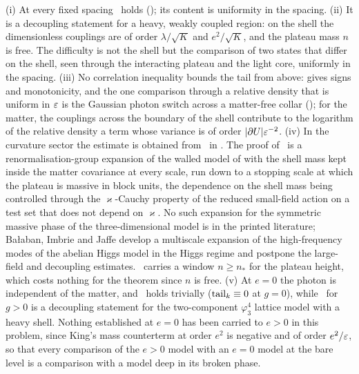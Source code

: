 \begin{remark}\label{rot:rem:REScontent}
(i) At every fixed spacing \REa\ holds (); its content is uniformity in the spacing. (ii) It is a decoupling statement for a heavy, weakly coupled region: on the shell the dimensionless couplings are of order $\lambda/\sqrt K$ and $e^2/\sqrt K$, and the plateau mass $n$ is free. The difficulty is not the shell but the comparison of two states that differ on the shell, seen through the interacting plateau and the light core, uniformly in the spacing. (iii) No correlation inequality bounds the tail from above:  gives signs and monotonicity, and the one comparison through a relative density that is uniform in $\varepsilon$ is the Gaussian photon switch across a matter-free collar (); for the matter, the couplings across the boundary of the shell contribute to the logarithm of the relative density a term whose variance is of order $|\partial U|\varepsilon^{-2}$. (iv) In the curvature sector the estimate is obtained from \HS\ in . The proof of \HS\ is a renormalisation-group expansion of the walled model of \cite{K1,K2} with the shell mass kept inside the matter covariance at every scale, run down to a stopping scale at which the plateau is massive in block units, the dependence on the shell mass being controlled through the $\varkappa$-Cauchy property of the reduced small-field action on a test set that does not depend on $\varkappa$. No such expansion for the symmetric massive phase of the three-dimensional model is in the printed literature; Ba{\l}aban, Imbrie and Jaffe \cite{BIJ88} develop a multiscale expansion of the high-frequency modes of the abelian Higgs model in the Higgs regime and postpone the large-field and decoupling estimates. \HS\ carries a window $n\ge n_*$ for the plateau height, which costs nothing for the theorem since $n$ is free. (v) At $e=0$ the photon is independent of the matter, and \REz\ holds trivially ($\operatorname{tail}_k\equiv0$ at $g=0$), while \REa\ for $g>0$ is a decoupling statement for the two-component $\varphi^4_3$ lattice model with a heavy shell. Nothing established at $e=0$ has been carried to $e>0$ in this problem, since King's mass counterterm at order $e^2$ is negative and of order $e^2/\varepsilon$, so that every comparison of the $e>0$ model with an $e=0$ model at the bare level is a comparison with a model deep in its broken phase.
\end{remark}

